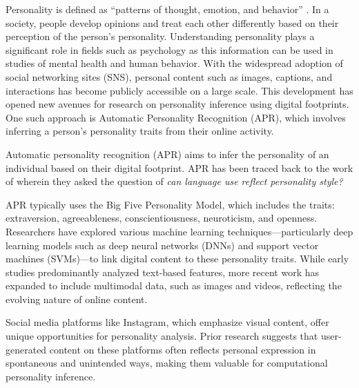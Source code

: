 Personality is defined as “patterns of thought, emotion, and behavior” \citep{Vinciarelli2014}. In a society, people develop opinions and treat each other differently based on their perception of the person’s personality. Understanding personality plays a significant role in fields such as psychology as this information can be used in studies of mental health and human behavior. 
With the widespread adoption of social networking sites (SNS), personal content such as images, captions, and interactions has become publicly accessible on a large scale. This development has opened new avenues for research on personality inference using digital footprints. One such approach is Automatic Personality Recognition (APR), which involves inferring a person’s personality traits from their online activity.

Automatic personality recognition (APR) aims to infer the personality of an individual based on their digital footprint. APR has been traced back to the work of \citet{Pennebaker1999} wherein they asked the question of \textit{can language use reflect personality style?}

APR typically uses the Big Five Personality Model, which includes the traits: extraversion, agreeableness, conscientiousness, neuroticism, and openness. Researchers have explored various machine learning techniques—particularly deep learning models such as deep neural networks (DNNs) and support vector machines (SVMs)—to link digital content to these personality traits. While early studies predominantly analyzed text-based features, more recent work has expanded to include multimodal data, such as images and videos, reflecting the evolving nature of online content.

Social media platforms like Instagram, which emphasize visual content, offer unique opportunities for personality analysis. Prior research suggests that user-generated content on these platforms often reflects personal expression in spontaneous and unintended ways, making them valuable for computational personality inference.

